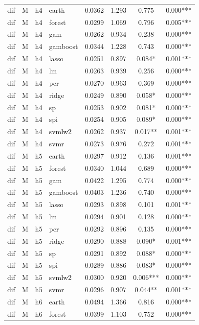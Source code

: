 \begin{ThreePartTable}
\begin{longtable}[t]{llclcccc}
\addlinespace
dif & M & h4 & earth & 0.0362 & 1.293 & 0.775 & 0.000***\\
dif & M & h4 & forest & 0.0299 & 1.069 & 0.796 & 0.005***\\
dif & M & h4 & gam & 0.0262 & 0.934 & 0.238 & 0.000***\\
dif & M & h4 & gamboost & 0.0344 & 1.228 & 0.743 & 0.000***\\
dif & M & h4 & lasso & 0.0251 & 0.897 & 0.084* & 0.001***\\
dif & M & h4 & lm & 0.0263 & 0.939 & 0.256 & 0.000***\\
dif & M & h4 & pcr & 0.0270 & 0.963 & 0.369 & 0.000***\\
dif & M & h4 & ridge & 0.0249 & 0.890 & 0.058* & 0.000***\\
dif & M & h4 & sp & 0.0253 & 0.902 & 0.081* & 0.000***\\
dif & M & h4 & spi & 0.0254 & 0.905 & 0.089* & 0.000***\\
dif & M & h4 & svmlw2 & 0.0262 & 0.937 & 0.017** & 0.001***\\
dif & M & h4 & svmr & 0.0273 & 0.976 & 0.272 & 0.001***\\
\addlinespace
dif & M & h5 & earth & 0.0297 & 0.912 & 0.136 & 0.001***\\
dif & M & h5 & forest & 0.0340 & 1.044 & 0.689 & 0.000***\\
dif & M & h5 & gam & 0.0422 & 1.295 & 0.774 & 0.000***\\
dif & M & h5 & gamboost & 0.0403 & 1.236 & 0.740 & 0.000***\\
dif & M & h5 & lasso & 0.0293 & 0.898 & 0.101 & 0.001***\\
dif & M & h5 & lm & 0.0294 & 0.901 & 0.128 & 0.000***\\
dif & M & h5 & pcr & 0.0292 & 0.896 & 0.135 & 0.000***\\
dif & M & h5 & ridge & 0.0290 & 0.888 & 0.090* & 0.001***\\
dif & M & h5 & sp & 0.0291 & 0.892 & 0.088* & 0.000***\\
dif & M & h5 & spi & 0.0289 & 0.886 & 0.083* & 0.000***\\
dif & M & h5 & svmlw2 & 0.0300 & 0.920 & 0.006*** & 0.000***\\
dif & M & h5 & svmr & 0.0296 & 0.907 & 0.044** & 0.001***\\
\addlinespace
dif & M & h6 & earth & 0.0494 & 1.366 & 0.816 & 0.000***\\
dif & M & h6 & forest & 0.0399 & 1.103 & 0.752 & 0.000***\\

\end{longtable}
\end{ThreePartTable}
